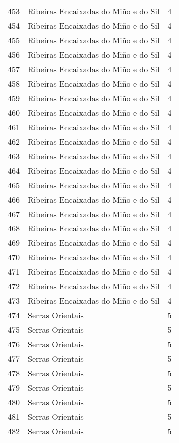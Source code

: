 \begin{table}[p]
\begin{tabular}{rlr}
  453 & Ribeiras Encaixadas do Miño e do Sil &   4 \\ 
  454 & Ribeiras Encaixadas do Miño e do Sil &   4 \\ 
  455 & Ribeiras Encaixadas do Miño e do Sil &   4 \\ 
  456 & Ribeiras Encaixadas do Miño e do Sil &   4 \\ 
  457 & Ribeiras Encaixadas do Miño e do Sil &   4 \\ 
  458 & Ribeiras Encaixadas do Miño e do Sil &   4 \\ 
  459 & Ribeiras Encaixadas do Miño e do Sil &   4 \\ 
  460 & Ribeiras Encaixadas do Miño e do Sil &   4 \\ 
  461 & Ribeiras Encaixadas do Miño e do Sil &   4 \\ 
  462 & Ribeiras Encaixadas do Miño e do Sil &   4 \\ 
  463 & Ribeiras Encaixadas do Miño e do Sil &   4 \\ 
  464 & Ribeiras Encaixadas do Miño e do Sil &   4 \\ 
  465 & Ribeiras Encaixadas do Miño e do Sil &   4 \\ 
  466 & Ribeiras Encaixadas do Miño e do Sil &   4 \\ 
  467 & Ribeiras Encaixadas do Miño e do Sil &   4 \\ 
  468 & Ribeiras Encaixadas do Miño e do Sil &   4 \\ 
  469 & Ribeiras Encaixadas do Miño e do Sil &   4 \\ 
  470 & Ribeiras Encaixadas do Miño e do Sil &   4 \\ 
  471 & Ribeiras Encaixadas do Miño e do Sil &   4 \\ 
  472 & Ribeiras Encaixadas do Miño e do Sil &   4 \\ 
  473 & Ribeiras Encaixadas do Miño e do Sil &   4 \\ 
  474 & Serras Orientais &   5 \\ 
  475 & Serras Orientais &   5 \\ 
  476 & Serras Orientais &   5 \\ 
  477 & Serras Orientais &   5 \\ 
  478 & Serras Orientais &   5 \\ 
  479 & Serras Orientais &   5 \\ 
  480 & Serras Orientais &   5 \\ 
  481 & Serras Orientais &   5 \\ 
  482 & Serras Orientais &   5 \\ 

\end{tabular}
\end{table}
